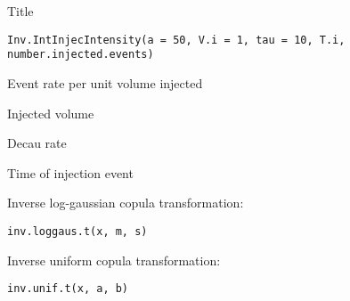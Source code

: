 \documentclass[letterpaper]{book}
\begin{document}
%
\begin{Description}\relax
Title
\end{Description}
%
\begin{Usage}
\begin{verbatim}
Inv.IntInjecIntensity(a = 50, V.i = 1, tau = 10, T.i, number.injected.events)
\end{verbatim}
\end{Usage}
%
\begin{Arguments}
\begin{ldescription}
\item[\code{a}] Event rate per unit volume injected

\item[\code{V.i}] Injected volume

\item[\code{tau}] Decau rate 

\item[\code{T.i}] Time of injection event

\item[\code{number.injected.events}] 
\end{ldescription}
\end{Arguments}
%
\begin{Description}\relax
Inverse log-gaussian copula transformation:
\end{Description}
%
\begin{Usage}
\begin{verbatim}
inv.loggaus.t(x, m, s)
\end{verbatim}
\end{Usage}
%
\begin{Arguments}
\begin{ldescription}
\item[\code{s}] 
\end{ldescription}
\end{Arguments}
%
\begin{Description}\relax
Inverse uniform copula transformation:
\end{Description}
%
\begin{Usage}
\begin{verbatim}
inv.unif.t(x, a, b)
\end{verbatim}
\end{Usage}
\end{document}
